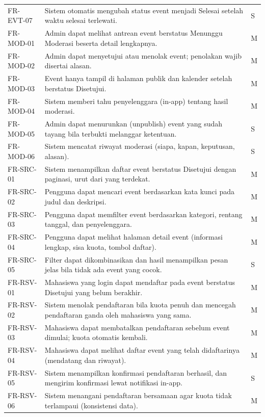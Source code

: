 \documentclass[11pt,a4paper]{article}
\begin{document}
\begin{longtable}{p{2.8cm}p{10.7cm}p{.5cm}}
FR-EVT-07 & Sistem otomatis mengubah status event menjadi Selesai setelah waktu selesai terlewati. & S\\
FR-MOD-01 & Admin dapat melihat antrean event berstatus Menunggu Moderasi beserta detail lengkapnya. & M\\
FR-MOD-02 & Admin dapat menyetujui atau menolak event; penolakan wajib disertai alasan. & M\\
FR-MOD-03 & Event hanya tampil di halaman publik dan kalender setelah berstatus Disetujui. & M\\
FR-MOD-04 & Sistem memberi tahu penyelenggara (in-app) tentang hasil moderasi. & M\\
FR-MOD-05 & Admin dapat menurunkan (unpublish) event yang sudah tayang bila terbukti melanggar ketentuan. & S\\
FR-MOD-06 & Sistem mencatat riwayat moderasi (siapa, kapan, keputusan, alasan). & S\\
FR-SRC-01 & Sistem menampilkan daftar event berstatus Disetujui dengan paginasi, urut dari yang terdekat. & M\\
FR-SRC-02 & Pengguna dapat mencari event berdasarkan kata kunci pada judul dan deskripsi. & M\\
FR-SRC-03 & Pengguna dapat memfilter event berdasarkan kategori, rentang tanggal, dan penyelenggara. & M\\
FR-SRC-04 & Pengguna dapat melihat halaman detail event (informasi lengkap, sisa kuota, tombol daftar). & M\\
FR-SRC-05 & Filter dapat dikombinasikan dan hasil menampilkan pesan jelas bila tidak ada event yang cocok. & S\\
FR-RSV-01 & Mahasiswa yang login dapat mendaftar pada event berstatus Disetujui yang belum berakhir. & M\\
FR-RSV-02 & Sistem menolak pendaftaran bila kuota penuh dan mencegah pendaftaran ganda oleh mahasiswa yang sama. & M\\
FR-RSV-03 & Mahasiswa dapat membatalkan pendaftaran sebelum event dimulai; kuota otomatis kembali. & M\\
FR-RSV-04 & Mahasiswa dapat melihat daftar event yang telah didaftarinya (mendatang dan riwayat). & M\\
FR-RSV-05 & Sistem menampilkan konfirmasi pendaftaran berhasil, dan mengirim konfirmasi lewat notifikasi in-app. & S\\
FR-RSV-06 & Sistem menangani pendaftaran bersamaan agar kuota tidak terlampaui (konsistensi data). & M\\

\end{longtable}
\end{document}

